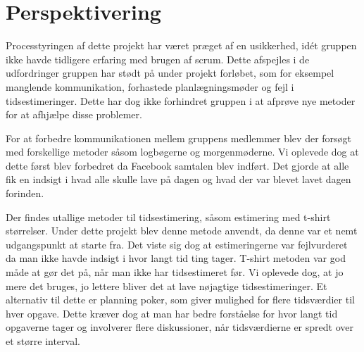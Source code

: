 


\chapter{Perspektivering}
Processtyringen af dette projekt har været præget af en usikkerhed, idét gruppen ikke havde tidligere erfaring med brugen af scrum. Dette afspejles i de udfordringer gruppen har stødt på under projekt forløbet, som for eksempel manglende kommunikation, forhastede planlægningsmøder og fejl i tidsestimeringer. Dette har dog ikke forhindret gruppen i at afprøve nye metoder for at afhjælpe disse problemer. \newline

\noindent For at forbedre kommunikationen mellem gruppens medlemmer blev der forsøgt med forskellige metoder såsom logbøgerne og morgenmøderne. Vi oplevede dog at dette først blev forbedret da Facebook samtalen blev indført. Det gjorde at alle fik en indsigt i hvad alle skulle lave på dagen og hvad der var blevet lavet dagen forinden. \newline

\noindent Der findes utallige metoder til tidsestimering, såsom estimering med t-shirt størrelser. Under dette projekt blev denne metode anvendt, da denne var et nemt udgangspunkt at starte fra. Det viste sig dog at estimeringerne var fejlvurderet da man ikke havde indsigt i hvor langt tid ting tager. T-shirt metoden var god måde at gør det på, når man ikke har tidsestimeret før. Vi oplevede dog, at jo mere det bruges, jo lettere bliver det at lave nøjagtige tidsestimeringer. Et alternativ til dette er planning poker, som giver mulighed for flere tidsværdier til hver opgave. Dette kræver dog at man har bedre forståelse for hvor langt tid opgaverne tager og involverer flere diskussioner, når tidsværdierne er spredt over et større interval.

